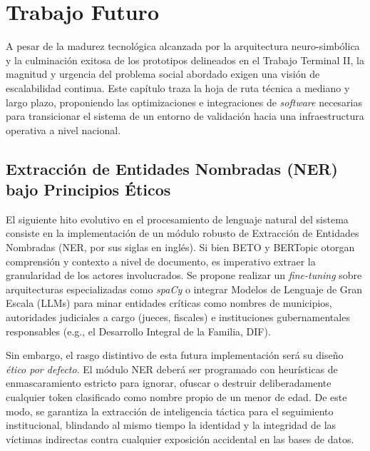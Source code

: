 

\chapter{Trabajo Futuro}
\label{cap:trabajofuturo}

A pesar de la madurez tecnológica alcanzada por la arquitectura neuro-simbólica y la culminación exitosa de los prototipos delineados en el Trabajo Terminal II, la magnitud y urgencia del problema social abordado exigen una visión de escalabilidad continua. Este capítulo traza la hoja de ruta técnica a mediano y largo plazo, proponiendo las optimizaciones e integraciones de \textit{software} necesarias para transicionar el sistema de un entorno de validación hacia una infraestructura operativa a nivel nacional.

\section{Extracción de Entidades Nombradas (NER) bajo Principios Éticos}
\label{sec:tf_ner}

El siguiente hito evolutivo en el procesamiento de lenguaje natural del sistema consiste en la implementación de un módulo robusto de Extracción de Entidades Nombradas (NER, por sus siglas en inglés). Si bien BETO y BERTopic otorgan comprensión y contexto a nivel de documento, es imperativo extraer la granularidad de los actores involucrados. Se propone realizar un \textit{fine-tuning} sobre arquitecturas especializadas como \textit{spaCy} o integrar Modelos de Lenguaje de Gran Escala (LLMs) para minar entidades críticas como nombres de municipios, autoridades judiciales a cargo (jueces, fiscales) e instituciones gubernamentales responsables (e.g., el Desarrollo Integral de la Familia, DIF). 

Sin embargo, el rasgo distintivo de esta futura implementación será su diseño \textit{ético por defecto}. El módulo NER deberá ser programado con heurísticas de enmascaramiento estricto para ignorar, ofuscar o destruir deliberadamente cualquier token clasificado como nombre propio de un menor de edad. De este modo, se garantiza la extracción de inteligencia táctica para el seguimiento institucional, blindando al mismo tiempo la identidad y la integridad de las víctimas indirectas contra cualquier exposición accidental en las bases de datos.

